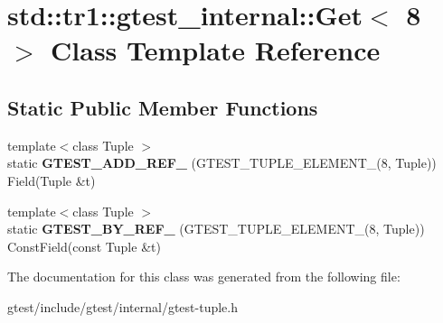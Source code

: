 \hypertarget{classstd_1_1tr1_1_1gtest__internal_1_1Get_3_018_01_4}{}\section{std\+:\+:tr1\+:\+:gtest\+\_\+internal\+:\+:Get$<$ 8 $>$ Class Template Reference}
\label{classstd_1_1tr1_1_1gtest__internal_1_1Get_3_018_01_4}
\subsection*{Static Public Member Functions}
\begin{DoxyCompactItemize}
\item 
\mbox{\label{classstd_1_1tr1_1_1gtest__internal_1_1Get_3_018_01_4_adf667300b7efed278f4ee3bf4d2edb85}} 
{\footnotesize template$<$class Tuple $>$ }\\static {\bfseries G\+T\+E\+S\+T\+\_\+\+A\+D\+D\+\_\+\+R\+E\+F\+\_\+} (G\+T\+E\+S\+T\+\_\+\+T\+U\+P\+L\+E\+\_\+\+E\+L\+E\+M\+E\+N\+T\+\_\+(8, Tuple)) Field(Tuple \&t)
\item 
\mbox{\label{classstd_1_1tr1_1_1gtest__internal_1_1Get_3_018_01_4_ab9645513ad2f983157f4062c89e910e7}} 
{\footnotesize template$<$class Tuple $>$ }\\static {\bfseries G\+T\+E\+S\+T\+\_\+\+B\+Y\+\_\+\+R\+E\+F\+\_\+} (G\+T\+E\+S\+T\+\_\+\+T\+U\+P\+L\+E\+\_\+\+E\+L\+E\+M\+E\+N\+T\+\_\+(8, Tuple)) Const\+Field(const Tuple \&t)
\end{DoxyCompactItemize}


The documentation for this class was generated from the following file\+:\begin{DoxyCompactItemize}
\item 
gtest/include/gtest/internal/gtest-\/tuple.\+h\end{DoxyCompactItemize}

